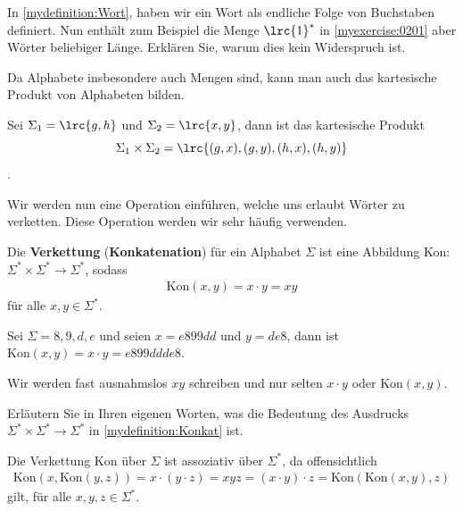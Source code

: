 \begin{myexercise}\label{myexercise:0202}
	In \cref{mydefinition:Wort}, haben wir ein Wort als endliche Folge von Buchstaben definiert. Nun enthält zum Beispiel die Menge $\lrc{1}^{*}$ in \cref{myexercise:0201} aber Wörter beliebiger Länge. Erklären Sie, warum dies kein Widerspruch ist.
\end{myexercise}

Da Alphabete insbesondere auch Mengen sind, kann man auch das kartesische Produkt von Alphabeten bilden.

\begin{myexample}
Sei $\Sigma_1 = \lrc{g,h}$ und $\Sigma_2 = \lrc{x,y}$, dann ist das kartesische Produkt
\[\Sigma_1\times \Sigma_2 = \lrc{(g,x),(g,y),(h,x),(h,y)}\].
\end{myexample}

Wir werden nun eine Operation einführen, welche uns erlaubt Wörter zu verketten. Diese Operation werden wir sehr häufig verwenden.
\begin{mydefinition}\label{mydefinition:Konkat}
Die \textbf{Verkettung} (\textbf{Konkatenation}) für ein Alphabet $\Sigma$ ist eine Abbildung
Kon: $\Sigma^*\times \Sigma^*\rightarrow\Sigma^*$, sodass
\begin{align*}
	\text{Kon}(x,y) = x\cdot y = xy
\end{align*}
für alle $x,y\in\Sigma^{*}$.
\end{mydefinition}
\begin{myexample}
Sei $\Sigma = {8,9,d,e}$ und seien $x = e899dd$ und $y = de8$, dann ist $\text{Kon}(x,y) = x\cdot y = e899ddde8$.
\end{myexample}

Wir werden fast ausnahmslos $xy$ schreiben und nur selten $x\cdot y$ oder $\text{Kon}(x,y)$.

\begin{myexercise}\label{myexercise:0203}
	Erläutern Sie in Ihren eigenen Worten, was die Bedeutung des Ausdrucks $\Sigma^*\times \Sigma^*\rightarrow\Sigma^*$ in \cref{mydefinition:Konkat} ist.
\end{myexercise}

Die Verkettung $\text{Kon}$ über $\Sigma$ ist assoziativ über $\Sigma^*$, da offensichtlich
\begin{align*}
	\text{Kon}(x,\text{Kon}(y,z)) = x\cdot (y\cdot z) = xyz = (x\cdot y)\cdot z = \text{Kon}(\text{Kon}(x,y),z)
\end{align*}
gilt, für alle $x,y,z\in\Sigma^*$.


